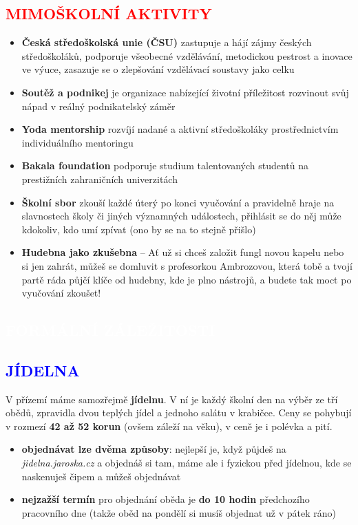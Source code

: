 \documentclass[a5paper, twoside]{article}
\newcommand{\nadpis}[4]{
  \vspace*{-50pt}
  \begin{tcolorbox}[colback = #2, boxrule = 0pt, grow to left by = #4,  grow to right by = #4, arc=8pt, height = 40pt]
    \vspace*{5pt}
    \centering \section*{\textcolor{#3}{#1}}
  \end{tcolorbox}
}
\newcommand{\podnadpis}[2]{
  \subsection*{\textcolor{#2}{#1}}
}
\begin{document}
\podnadpis{MIMOŠKOLNÍ AKTIVITY}{red}
\begin{itemize}[leftmargin=10pt]
	\item \textbf{Česká středoškolská unie (ČSU)} zastupuje a hájí zájmy českých středoškoláků, podporuje všeobecné vzdělávání, metodickou pestrost a inovace ve výuce, zasazuje se o zlepšování vzdělávací soustavy jako celku
	\item \textbf{Soutěž a podnikej} je organizace nabízející životní příležitost rozvinout svůj nápad v reálný podnikatelský záměr
	\item \textbf{Yoda mentorship} rozvíjí nadané a aktivní středoškoláky prostřednictvím individuálního mentoringu
	\item \textbf{Bakala foundation} podporuje studium talentovaných studentů na prestižních zahraničních univerzitách
	\item \textbf{Školní sbor} zkouší každé úterý po konci vyučování a pravidelně hraje na slavnostech školy či jiných významných událostech, přihlásit se do něj může kdokoliv, kdo umí zpívat (ono by se na to stejně přišlo)
	\item \textbf{Hudebna jako zkušebna} -- Ať už si chceš založit fungl novou kapelu nebo si jen zahrát, můžeš se domluvit s profesorkou Ambrozovou, která tobě a tvojí partě ráda půjčí klíče od hudebny, kde je plno nástrojů, a budete tak moct po vyučování zkoušet!
\end{itemize}

\newpage

\nadpis{FORMÁLNÍ ZÁLEŽITOSTI}{blue}{white}{-2.5cm}

\noindent \podnadpis{JÍDELNA}{blue}
V přízemí máme samozřejmě \textbf{jídelnu}. V ní je každý školní den na výběr ze tří obědů, zpravidla dvou teplých jídel a jednoho salátu v krabičce. Ceny se pohybují v rozmezí \textbf{42 až 52 korun} (ovšem záleží na věku), v ceně je i polévka a pití.

\begin{itemize}[leftmargin=10pt]
	\item \textbf{objednávat lze dvěma způsoby}: nejlepší je, když půjdeš na \textit{jidelna.jaroska.cz} a objednáš si tam, máme ale i fyzickou  před jídelnou, kde se naskenuješ čipem a můžeš objednávat
	\item \textbf{nejzažší termín} pro objednání oběda je \textbf{do 10 hodin} předchozího pracovního dne (takže oběd na pondělí si musíš objednat už v pátek ráno)
\end{itemize}
\end{document}

